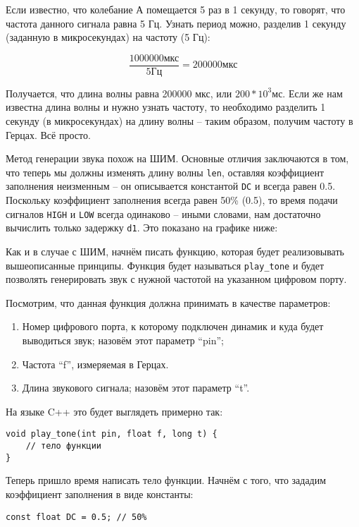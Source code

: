 \documentclass[../sparc.tex]{subfiles}
\begin{document}
Если известно, что колебание А помещается 5 раз в 1 секунду, то говорят, что
частота данного сигнала равна 5 Гц. Узнать период можно, разделив 1 секунду
(заданную в микросекундах) на частоту (5 Гц):

\begin{equation}
  \frac{1000000 \mbox{мкс}}{5 \mbox{Гц}} = 200000 \mbox{мкс}
\end{equation}

Получается, что длина волны равна 200000 мкс, или $ 200 * 10^3 \mbox{мс} $. Если
же нам известна длина волны и нужно узнать частоту, то необходимо разделить 1
секунду (в микросекундах) на длину волны -- таким образом, получим частоту в
Герцах. Всё просто.

Метод генерации звука похож на \gls{ШИМ}. Основные отличия заключаются в том,
что теперь мы должны изменять длину волны \texttt{len}, оставляя коэффициент
заполнения неизменным -- он описывается константой \texttt{DC} и всегда равен
0.5. Поскольку коэффициент заполнения всегда равен 50\% (0.5), то время подачи
сигналов \texttt{HIGH} и \texttt{LOW} всегда одинаково -- иными словами, нам
достаточно вычислить только задержку \texttt{d1}. Это показано на графике ниже:

Как и в случае с ШИМ, начнём писать функцию, которая будет реализовывать
вышеописанные принципы. Функция будет называться \texttt{play\_tone} и будет
позволять генерировать звук с нужной частотой на указанном цифровом порту.

Посмотрим, что данная функция должна принимать в качестве параметров:
\begin{enumerate}
\item Номер цифрового порта, к которому подключен динамик и куда будет
  выводиться звук; назовём этот параметр ``pin'';
\item Частота ``f'', измеряемая в Герцах. 
\item Длина звукового сигнала; назовём этот параметр ``t''.
\end{enumerate}

На языке C++ это будет выглядеть примерно так:
\begin{verbatim}
void play_tone(int pin, float f, long t) {
    // тело функции
}
\end{verbatim}

Теперь пришло время написать тело функции. Начнём с того, что зададим
коэффициент заполнения в виде константы:
\begin{verbatim}
const float DC = 0.5; // 50%
\end{verbatim}
\end{document}
